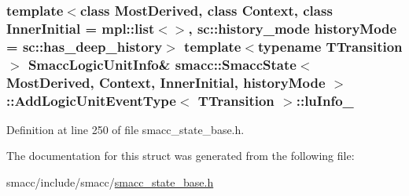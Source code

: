 \subsubsection[{\texorpdfstring{lu\+Info\+\_\+}{luInfo_}}]{\setlength{\rightskip}{0pt plus 5cm}template$<$class Most\+Derived, class Context, class Inner\+Initial = mpl\+::list$<$$>$, sc\+::history\+\_\+mode history\+Mode = sc\+::has\+\_\+deep\+\_\+history$>$ template$<$typename T\+Transition $>$ {\bf Smacc\+Logic\+Unit\+Info}\& {\bf smacc\+::\+Smacc\+State}$<$ Most\+Derived, Context, Inner\+Initial, history\+Mode $>$\+::{\bf Add\+Logic\+Unit\+Event\+Type}$<$ T\+Transition $>$\+::lu\+Info\+\_\+}\hypertarget{structsmacc_1_1SmaccState_1_1AddLogicUnitEventType_a31c27ea945cd0127080c0bae872c028e}{}\label{structsmacc_1_1SmaccState_1_1AddLogicUnitEventType_a31c27ea945cd0127080c0bae872c028e}


Definition at line 250 of file smacc\+\_\+state\+\_\+base.\+h.



The documentation for this struct was generated from the following file\+:\begin{DoxyCompactItemize}
\item 
smacc/include/smacc/\hyperlink{smacc__state__base_8h}{smacc\+\_\+state\+\_\+base.\+h}\end{DoxyCompactItemize}
